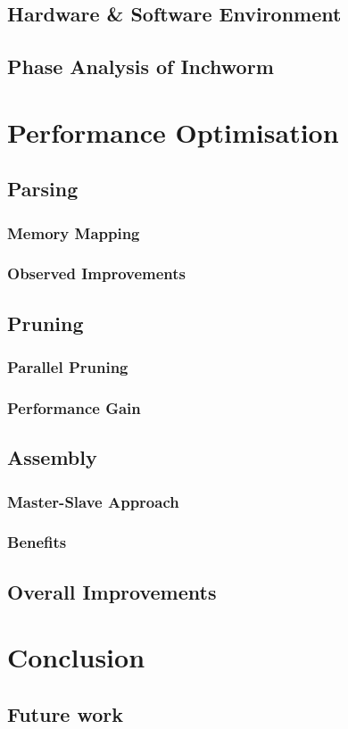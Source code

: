 \documentclass[plainarticle,zihtitle,english,final,hyperref,utf8]{zihpub}
\begin{document}
\subsection{Hardware \& Software Environment}
\subsection{Phase Analysis of Inchworm}

\section{Performance Optimisation}
\subsection{Parsing}
\subsubsection{Memory Mapping}
\subsubsection{Observed Improvements}
\subsection{Pruning}
\subsubsection{Parallel Pruning}
\subsubsection{Performance Gain}
\subsection{Assembly}
\subsubsection{Master-Slave Approach}
\subsubsection{Benefits}
\subsection{Overall Improvements}
\section{Conclusion}
\subsection{Future work}
\end{document}
